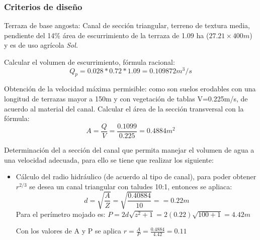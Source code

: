     \subsubsection{Criterios de diseño}
    \begin{example}
        Terraza de base angosta: Canal de sección triangular, terreno de textura media, pendiente del 14\% área de escurrimiento de la terraza de 1.09 ha ($27.21\times 400m$) y es de uso agrícola
        \textit{ Sol. }
        
        Calcular el volumen de escurrimiento, fórmula racional:
        \begin{equation*}
            Q_p=0.028*0.72*1.09=0.109872m^3/s
        \end{equation*}
        
        Obtención de la velocidad máxima permisible: como son suelos erodables con una longitud de terrazas mayor a 150m y con vegetación de tablas V=0.225m/s, de acuerdo al material del canal.
        Calcular el área de la sección transversal con la fórmula:
        \begin{equation*}
            A= \frac{Q}{V} =\frac{0.1099}{0.225}=0.4884m^2
        \end{equation*}
    
    Determinación del a sección del canal que permita manejar el volumen de agua a una velocidad adecuada, para ello se tiene que realizar los siguiente:
    \begin{itemize}
        \item Cálculo del radio hidráulico (de acuerdo al tipo de canal), para poder obtener $r^{2/3}$ se desea un canal triangular con taludes 10:1, entonces se apliaca:
        \begin{equation*}
            d = \sqrt{\frac{A}{Z}} = \sqrt{\frac{0.40884}{10}}== 0.22m
        \end{equation*}
        Para el perímetro mojado es: $P=2d \sqrt{z^2+1}=2(0.22)\sqrt{100+1}=4.42m$
    
        Con los valores de A y P se aplica $r=\frac{A}{P}=\frac{0.4884}{4.42}=0.11$
        

\end{itemize}
\end{example}
